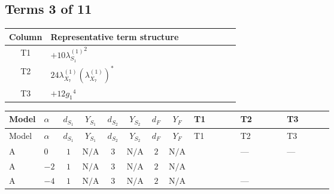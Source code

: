 \documentclass[8pt]{article}
\begin{document}
\begin{landscape}
\subsection*{Terms 3 of 11}
\begin{center}
\begin{tabular}{@{}c >{\raggedright\arraybackslash}p{0.82\linewidth}@{}}
\toprule
Column & Representative term structure \\
\midrule
T1 & \(\displaystyle +10 {\lambda_{S_1}^{(1)}}^2\) \\
\midrule
T2 & \(\displaystyle 24 {\lambda_{X_{7}}^{(1)}} \left({\lambda_{X_{7}}^{(1)}}\right)^{*}\) \\
\midrule
T3 & \(\displaystyle +12 {g_1}^4\) \\
\midrule
\bottomrule
\end{tabular}
\end{center}
\smallskip
\tiny
\begin{longtable}{@{}llcccccc >{\raggedright\arraybackslash}p{0.21\linewidth} >{\raggedright\arraybackslash}p{0.21\linewidth} >{\raggedright\arraybackslash}p{0.21\linewidth}@{}}
\toprule
Model & $\alpha$ & $d_{S_1}$ & $Y_{S_1}$ & $d_{S_2}$ & $Y_{S_2}$ & $d_F$ & $Y_F$ & T1 & T2 & T3 \\
\midrule
\endfirsthead
\toprule
Model & $\alpha$ & $d_{S_1}$ & $Y_{S_1}$ & $d_{S_2}$ & $Y_{S_2}$ & $d_F$ & $Y_F$ & T1 & T2 & T3 \\
\midrule
\endhead
A & $0$ & $1$ & $\text{N/A}$ & $3$ & $\text{N/A}$ & $2$ & $\text{N/A}$ & \scriptsize\adjustbox{max width=\linewidth}{$\begin{gathered} +10 {\lambda_{S_1}^{(1)}}^2\end{gathered}$} & --- & --- \\
\midrule
A & $-2$ & $1$ & $\text{N/A}$ & $3$ & $\text{N/A}$ & $2$ & $\text{N/A}$ & \scriptsize\adjustbox{max width=\linewidth}{$\begin{gathered} +10 {\lambda_{S_1}^{(1)}}^2\end{gathered}$} & \scriptsize\adjustbox{max width=\linewidth}{$\begin{gathered} 24 {\lambda_{X_{7}}^{(1)}} \left({\lambda_{X_{7}}^{(1)}}\right)^{*}\end{gathered}$} & \scriptsize\adjustbox{max width=\linewidth}{$\begin{gathered} +12 {g_1}^4\end{gathered}$} \\
\midrule
A & $-4$ & $1$ & $\text{N/A}$ & $3$ & $\text{N/A}$ & $2$ & $\text{N/A}$ & \scriptsize\adjustbox{max width=\linewidth}{$\begin{gathered} +10 {\lambda_{S_1}^{(1)}}^2\end{gathered}$} & --- & \scriptsize\adjustbox{max width=\linewidth}{$\begin{gathered} 192 {g_1}^4\end{gathered}$} \\

\end{longtable}
\end{landscape}
\end{document}
